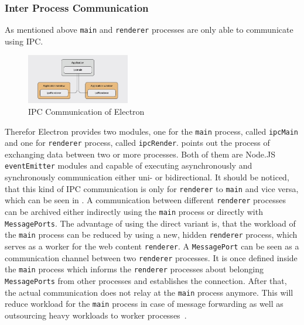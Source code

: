 \subsubsection{Inter Process Communication}
As mentioned above \texttt{main} and \texttt{renderer} processes are only able to communicate using \ac{IPC}.
\begin{figure}[ht]
    \centering
    \includegraphics[width=0.4\textwidth]{images/ipcElectron}
    \caption[Bla]{IPC Communication of Electron~\cite[Fig. 6.5]{electron-nwjs}}
    \label{fig:electron:ipc}
\end{figure}
Therefor Electron provides two modules, one for the \texttt{main} process, called \texttt{ipcMain} and one for \texttt{renderer} process, called \texttt{ipcRender}.
 points out the process of exchanging data between two or more processes.
Both of them are Node.JS \texttt{eventEmitter} modules and capable of executing asynchronously and synchronously communication either uni- or bidirectional.
It should be noticed, that this kind of \ac{IPC} communication is only for \texttt{renderer} to \texttt{main} and vice versa, which can be seen in .
A communication between different \texttt{renderer} processes can be archived either indirectly using the \texttt{main} process or directly with \texttt{MessagePorts}.
The advantage of using the direct variant is, that the workload of the \texttt{main} process can be reduced by using a new, hidden \texttt{renderer} process, which serves as a worker for the web content \texttt{renderer}.
A \texttt{MessagePort} can be seen as a communication channel between two \texttt{renderer} processes.
It is once defined inside the \texttt{main} process which informs the \texttt{renderer} processes about belonging \texttt{MessagePorts} from other processes and establishes the connection.
After that, the actual communication does not relay at the \texttt{main} process anymore.
This will reduce workload for the \texttt{main} process in case of message forwarding as well as outsourcing heavy workloads to worker processes~\cite{ElectronDoc}.
